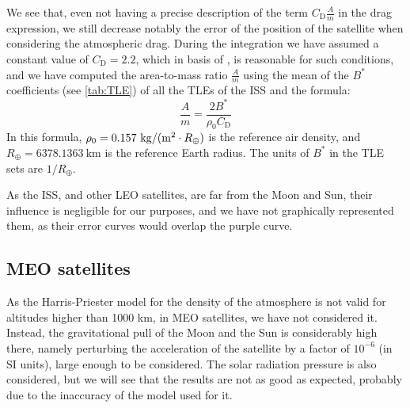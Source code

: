 \documentclass[../main.tex]{subfiles}
\begin{document}
We see that, even not having a precise description of the term $C_\mathrm{D}\frac{A}{m}$ in the drag expression, we still decrease notably the error of the position of the satellite when considering the atmospheric drag. During the integration we have assumed a constant value of $C_\mathrm{D}=2.2$, which in basis of \cite{montenbruck}, is reasonable for such conditions, and we have computed the area-to-mass ratio $\frac{A}{m}$ using the mean of the $B^*$ coefficients (see \cref{tab:TLE}) of all the TLEs of the ISS and the formula:
\begin{equation}
  \frac{A}{m}=\frac{2 B^*}{\rho_0 C_\mathrm{D}}
\end{equation}
In this formula, $\rho_0=0.157\ \mathrm{kg}/(\mathrm{m}^2 \cdot R_\oplus)$ is the reference air density, and $R_\oplus=6378.1363\ \mathrm{km}$ is the reference Earth radius. The units of $B^*$ in the TLE sets are $1 / R_\oplus$.

As the ISS, and other LEO satellites, are far from the Moon and Sun, their influence is negligible for our purposes, and we have not graphically represented them, as their error curves would overlap the purple curve.

\subsection{MEO satellites}
As the Harris-Priester model for the density of the atmosphere is not valid for altitudes higher than 1000 km, in MEO satellites, we have not considered it. Instead, the gravitational pull of the Moon and the Sun is considerably high there, namely perturbing the acceleration of the satellite by a factor of $10^{-6}$ (in SI units), large enough to be considered. The solar radiation pressure is also considered, but we will see that the results are not as good as expected, probably due to the inaccuracy of the model used for it.
\end{document}
